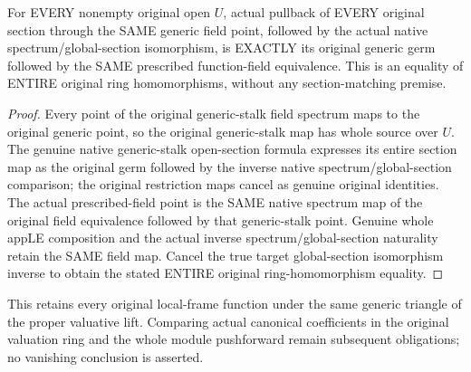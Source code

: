 \begin{theorem}
\label{sc0-generic-field-sections:entire-section-square}
\leanok
For EVERY nonempty original open $U$, actual pullback of EVERY
original section through the SAME generic field point, followed
by the actual native spectrum/global-section isomorphism, is
EXACTLY its original generic germ followed by the SAME prescribed
function-field equivalence. This is an equality of ENTIRE original
ring homomorphisms, without any section-matching premise.
\end{theorem}
\begin{proof}
Every point of the original generic-stalk field spectrum maps to
the original generic point, so the original generic-stalk map has
whole source over $U$. The genuine native generic-stalk open-section
formula expresses its entire section map as the original germ
followed by the inverse native spectrum/global-section comparison;
the original restriction maps cancel as genuine original identities.
The actual prescribed-field point is the SAME native spectrum map
of the original field equivalence followed by that generic-stalk
point. Genuine whole appLE composition and the actual inverse
spectrum/global-section naturality retain the SAME field map.
Cancel the true target global-section isomorphism inverse to obtain
the stated ENTIRE original ring-homomorphism equality.
\end{proof}

This retains every original local-frame function under the same
generic triangle of the proper valuative lift. Comparing actual
canonical coefficients in the original valuation ring and the
whole module pushforward remain subsequent obligations; no
vanishing conclusion is asserted.
